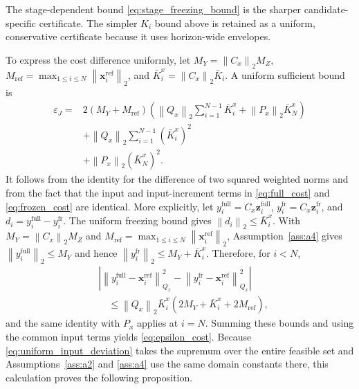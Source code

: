 \documentclass[journal]{IEEEtran}
\newcommand{\vx}{\mathbf{x}}
\newcommand{\vz}{\mathbf{z}}
\newcommand{\norm}[1]{\left\lVert #1\right\rVert}
\begin{document}
The stage-dependent bound \eqref{eq:stage_freezing_bound} is the sharper candidate-specific certificate. The simpler $K_i$ bound above is retained as a uniform, conservative certificate because it uses horizon-wide envelopes.

To express the cost difference uniformly, let $M_Y=\norm{C_x}_2M_Z$, $M_{\mathrm{ref}}=\max_{1\le i\le N}\norm{\vx_i^{\mathrm{ref}}}_2$, and $\bar K_i^x=\norm{C_x}_2\bar K_i$. A uniform sufficient bound is
\begin{equation}
\begin{aligned}
\varepsilon_J={}&2(M_Y+M_{\mathrm{ref}})
 \left(\norm{Q_x}_2\sum_{i=1}^{N-1}\bar K_i^x
 +\norm{P_x}_2\bar K_N^x\right)\\
&+\norm{Q_x}_2\sum_{i=1}^{N-1}(\bar K_i^x)^2\\
&+\norm{P_x}_2(\bar K_N^x)^2.
\end{aligned}
\label{eq:epsilon_cost}
\end{equation}
It follows from the identity for the difference of two squared weighted norms and from the fact that the input and input-increment terms in \eqref{eq:full_cost} and \eqref{eq:frozen_cost} are identical. More explicitly, let $y_i^{\mathrm{full}}=C_x\vz_i^{\mathrm{full}}$, $y_i^{\mathrm{fr}}=C_x\vz_i^{\mathrm{fr}}$, and $d_i=y_i^{\mathrm{full}}-y_i^{\mathrm{fr}}$. The uniform freezing bound gives $\norm{d_i}_2\le\bar K_i^x$. With $M_Y=\norm{C_x}_2M_Z$ and $M_{\mathrm{ref}}=\max_{1\le i\le N}\norm{\vx_i^{\mathrm{ref}}}_2$, Assumption~\ref{ass:a4} gives $\norm{y_i^{\mathrm{full}}}_2\le M_Y$ and hence $\norm{y_i^{\mathrm{fr}}}_2\le M_Y+\bar K_i^x$. Therefore, for $i<N$,
\begin{equation}
\begin{aligned}
&\left|\norm{y_i^{\mathrm{full}}-\vx_i^{\mathrm{ref}}}_{Q_x}^2-
\norm{y_i^{\mathrm{fr}}-\vx_i^{\mathrm{ref}}}_{Q_x}^2\right|\\
&\quad\le\norm{Q_x}_2\bar K_i^x(2M_Y+\bar K_i^x+2M_{\mathrm{ref}}),
\end{aligned}
\end{equation}
and the same identity with $P_x$ applies at $i=N$. Summing these bounds and using the common input terms yields \eqref{eq:epsilon_cost}. Because \eqref{eq:uniform_input_deviation} takes the supremum over the entire feasible set and Assumptions~\ref{ass:a2} and \ref{ass:a4} use the same domain constants there, this calculation proves the following proposition.
\end{document}
